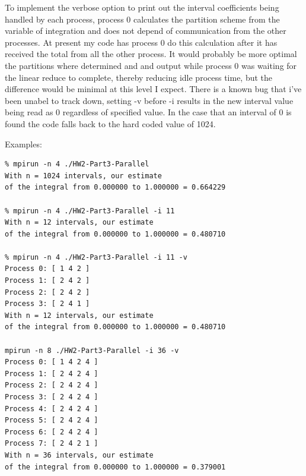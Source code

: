 \documentclass{IEEEtran}
\begin{document}
To implement the verbose option to print out the interval coefficients being handled by each process, process 0 calculates the partition scheme from the variable of integration and does not depend of communication from the other processes. At present my code has process 0  do this calculation after it has received the total from all the other process. It would probably be more optimal the partitions where determined and and output while process 0 was waiting for the linear reduce to complete, thereby reducing idle process time, but the difference would be minimal at this level I expect. There is a known bug that i've been unabel to track down, setting -v before -i results in the new interval value being read as 0 regardless of specified value. In the case that an interval of 0 is found the code falls back to the hard coded value of 1024.

Examples:

\begin{verbatim}
% mpirun -n 4 ./HW2-Part3-Parallel         
With n = 1024 intervals, our estimate
of the integral from 0.000000 to 1.000000 = 0.664229

% mpirun -n 4 ./HW2-Part3-Parallel -i 11
With n = 12 intervals, our estimate
of the integral from 0.000000 to 1.000000 = 0.480710

% mpirun -n 4 ./HW2-Part3-Parallel -i 11 -v
Process 0: [ 1 4 2 ]
Process 1: [ 2 4 2 ]
Process 2: [ 2 4 2 ]
Process 3: [ 2 4 1 ]
With n = 12 intervals, our estimate
of the integral from 0.000000 to 1.000000 = 0.480710

mpirun -n 8 ./HW2-Part3-Parallel -i 36 -v
Process 0: [ 1 4 2 4 ]
Process 1: [ 2 4 2 4 ]
Process 2: [ 2 4 2 4 ]
Process 3: [ 2 4 2 4 ]
Process 4: [ 2 4 2 4 ]
Process 5: [ 2 4 2 4 ]
Process 6: [ 2 4 2 4 ]
Process 7: [ 2 4 2 1 ]
With n = 36 intervals, our estimate
of the integral from 0.000000 to 1.000000 = 0.379001

\end{verbatim}
\end{document}
